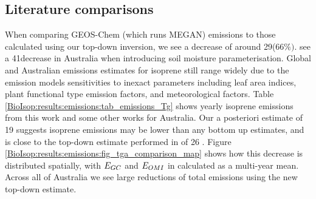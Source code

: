      
      
  \subsection{Literature comparisons}
    
    When comparing GEOS-Chem (which runs MEGAN) emissions to those calculated using our top-down inversion, we see a decrease of around 29\tgpyr ($66\%)$.
    \textcite{Sindelarova2014} see a 41\tgpyr decrease in Australia when introducing soil moisture parameterisation.
    Global and Australian emissions estimates for isoprene still range widely due to the emission models sensitivities to inexact parameters including leaf area indices, plant functional type emission factors, and meteorological factors.
    Table \ref{BioIsop:results:emissions:tab_emissions_Tg} shows yearly isoprene emissions from this work and some other works for Australia.
    Our a posteriori estimate of 19 \tgpyr suggests isoprene emissions may be lower than any bottom up estimates, and is close to the top-down estimate performed in \textcite{Bauwens2016} of 26 \tgpyr.
    Figure \ref{BioIsop:results:emissions:fig_tga_comparison_map} shows how this decrease is distributed spatially, with $E_{GC}$ and $E_{OMI}$ in \tgpyr calculated as a multi-year mean.
    Across all of Australia we see large reductions of total emissions using the new top-down estimate.
    
